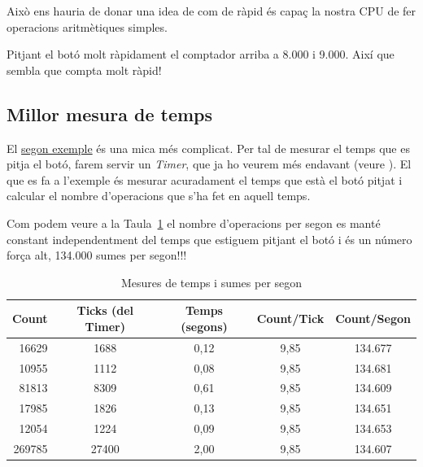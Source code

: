 Això ens hauria de donar una idea de com de ràpid és capaç la nostra CPU de fer operacions aritmètiques simples.

Pitjant el botó molt ràpidament el comptador arriba a 8.000 i 9.000. Així que sembla que compta molt ràpid!

\subsection{Millor mesura de temps}
\label{sub:speedtest_example}
El \href{https://github.com/mariusmm/cursembedded/tree/master/Simplicity/SpeedTest_2}{segon exemple} és una mica més complicat. Per tal de mesurar el temps que es pitja el botó, farem servir un {\em Timer}, que ja ho veurem més endavant (veure ). El que es fa a l'exemple és mesurar acuradament el temps que està el botó pitjat i calcular el nombre d'operacions que s'ha fet en aquell temps.

Com podem veure a la Taula~\ref{tb:SpeedTest} el nombre d’operacions per segon es manté constant independentment del temps que estiguem pitjant el botó i és un número força alt, 134.000 sumes per segon!!!

\begin{table}[t!]
\caption{Mesures de temps i sumes per segon}
\centering
\begin{tabular}{|r|c|c|c|c|}
\hline
{\bf Count} & {\bf Ticks (del Timer)} & {\bf Temps (segons)} & {\bf Count/Tick} & {\bf Count/Segon}\\
\hline
16629 & 1688 & 0,12 & 9,85 & 134.677\\
\hline
10955 & 1112	& 0,08 &	9,85	& 134.681\\
\hline
81813 & 8309	& 0,61 &	9,85	& 134.609\\
\hline
17985 & 1826 & 0,13 & 9,85 &134.651 \\
\hline
12054 &1224 & 0,09 & 9,85 & 134.653\\
\hline
269785 &27400 & 2,00 & 9,85 & 134.607\\
\hline
\end{tabular}
\label{tb:SpeedTest}
\end{table}
